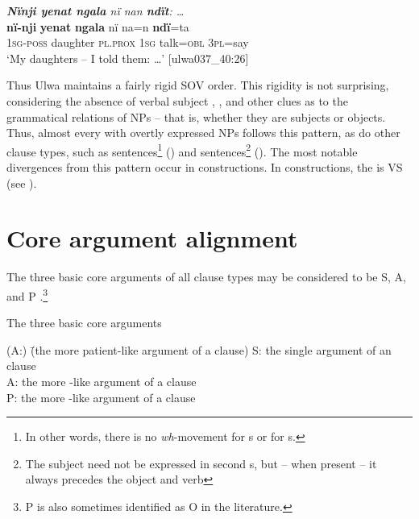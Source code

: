 \ea%
    \label{ex:clause:24}
          \textit{\textbf{Nïnji yenat ngala} nï nan \textbf{ndït}: …}\\
\gll    \textbf{nï-nji}    \textbf{yenat}    \textbf{ngala}    nï    na=n    \textbf{ndï}=ta\\
    1\textsc{sg-poss}  daughter  \textsc{pl.prox}  \textsc{1sg}  talk=\textsc{obl}  \textsc{3pl}=say\\
\glt `My daughters -- I told them: …’ [ulwa037\_40:26]
\z




  Thus Ulwa maintains a fairly rigid SOV order. This rigidity is not surprising, considering the absence of verbal subject ,  , and other clues as to the grammatical relations of NPs -- that is, whether they are subjects or objects. Thus, almost every   with overtly expressed NPs follows this pattern, as do other clause types, such as  sentences\footnote{In other words, there is no \textit{wh}-movement for s or  for s.} () and  sentences\footnote{The subject need not be expressed in second  s, but -- when present -- it always precedes the object and verb} (). The most notable divergences from this pattern occur in  constructions. In  constructions, the  is VS (see ).

\section{Core argument alignment}\label{sec:11.2}


The three basic core arguments of all clause types may be considered to be S, A, and P .\footnote{P is also sometimes identified as O in the literature.}

\ea%
    \label{ex:clause:24a}
The three basic core arguments
\begin{tabbing}
{(A:)} \= {(the more patient-like argument of a  clause)}\kill
{S:} \> {the single argument of an  clause}\\
{A:} \> {the more -like argument of a  clause}\\
{P:} \> {the more -like argument of a  clause}
\end{tabbing}
\z

